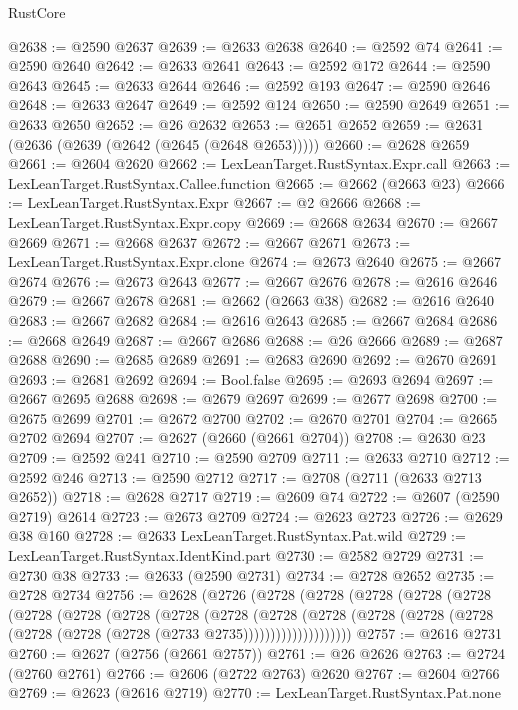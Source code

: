\begin{lexlean}{RustCore}
\begin{coremodule}
@2638 := @2590 @2637
@2639 := @2633 @2638
@2640 := @2592 @74
@2641 := @2590 @2640
@2642 := @2633 @2641
@2643 := @2592 @172
@2644 := @2590 @2643
@2645 := @2633 @2644
@2646 := @2592 @193
@2647 := @2590 @2646
@2648 := @2633 @2647
@2649 := @2592 @124
@2650 := @2590 @2649
@2651 := @2633 @2650
@2652 := @26 @2632
@2653 := @2651 @2652
@2659 := @2631 (@2636 (@2639 (@2642 (@2645 (@2648 @2653)))))
@2660 := @2628 @2659
@2661 := @2604 @2620
@2662 := LexLeanTarget.RustSyntax.Expr.call
@2663 := LexLeanTarget.RustSyntax.Callee.function
@2665 := @2662 (@2663 @23)
@2666 := LexLeanTarget.RustSyntax.Expr
@2667 := @2 @2666
@2668 := LexLeanTarget.RustSyntax.Expr.copy
@2669 := @2668 @2634
@2670 := @2667 @2669
@2671 := @2668 @2637
@2672 := @2667 @2671
@2673 := LexLeanTarget.RustSyntax.Expr.clone
@2674 := @2673 @2640
@2675 := @2667 @2674
@2676 := @2673 @2643
@2677 := @2667 @2676
@2678 := @2616 @2646
@2679 := @2667 @2678
@2681 := @2662 (@2663 @38)
@2682 := @2616 @2640
@2683 := @2667 @2682
@2684 := @2616 @2643
@2685 := @2667 @2684
@2686 := @2668 @2649
@2687 := @2667 @2686
@2688 := @26 @2666
@2689 := @2687 @2688
@2690 := @2685 @2689
@2691 := @2683 @2690
@2692 := @2670 @2691
@2693 := @2681 @2692
@2694 := Bool.false
@2695 := @2693 @2694
@2697 := @2667 @2695 @2688
@2698 := @2679 @2697
@2699 := @2677 @2698
@2700 := @2675 @2699
@2701 := @2672 @2700
@2702 := @2670 @2701
@2704 := @2665 @2702 @2694
@2707 := @2627 (@2660 (@2661 @2704))
@2708 := @2630 @23
@2709 := @2592 @241
@2710 := @2590 @2709
@2711 := @2633 @2710
@2712 := @2592 @246
@2713 := @2590 @2712
@2717 := @2708 (@2711 (@2633 @2713 @2652))
@2718 := @2628 @2717
@2719 := @2609 @74
@2722 := @2607 (@2590 @2719) @2614
@2723 := @2673 @2709
@2724 := @2623 @2723
@2726 := @2629 @38 @160
@2728 := @2633 LexLeanTarget.RustSyntax.Pat.wild
@2729 := LexLeanTarget.RustSyntax.IdentKind.part
@2730 := @2582 @2729
@2731 := @2730 @38
@2733 := @2633 (@2590 @2731)
@2734 := @2728 @2652
@2735 := @2728 @2734
@2756 := @2628
    (@2726
      (@2728
        (@2728
          (@2728
            (@2728
              (@2728
                (@2728
                  (@2728
                    (@2728
                      (@2728
                        (@2728
                          (@2728
                            (@2728
                              (@2728
                                (@2728 (@2728 (@2728 (@2728 (@2728 (@2733 @2735))))))))))))))))))))
@2757 := @2616 @2731
@2760 := @2627 (@2756 (@2661 @2757))
@2761 := @26 @2626
@2763 := @2724 (@2760 @2761)
@2766 := @2606 (@2722 @2763) @2620
@2767 := @2604 @2766
@2769 := @2623 (@2616 @2719)
@2770 := LexLeanTarget.RustSyntax.Pat.none

\end{coremodule}
\end{lexlean}
